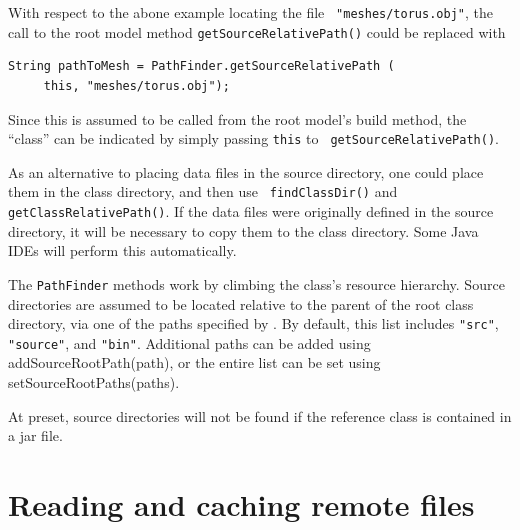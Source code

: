 With respect to the abone example locating the file {\tt
"meshes/torus.obj"}, the call to the root model method 
{\tt getSourceRelativePath()} could be replaced with
%
\begin{lstlisting}[]
  String pathToMesh = PathFinder.getSourceRelativePath (
     this, "meshes/torus.obj");
\end{lstlisting}
Since this is assumed to be called from the root model's build method,
the ``class'' can be indicated by simply passing {\tt this} to {\tt
getSourceRelativePath()}.

\begin{sideblock}
As an alternative to placing data files in the source directory, one
could place them in the class directory, and then use {\tt
findClassDir()} and {\tt getClassRelativePath()}. If the data files
were originally defined in the source directory, it will be necessary
to copy them to the class directory. Some Java IDEs will perform this
automatically.
\end{sideblock}

The {\tt PathFinder} methods work by climbing the class's resource
hierarchy.  Source directories are assumed to be located relative to
the parent of the root class directory, via one of the paths specified
by . By default, this
list includes {\tt "src"}, {\tt "source"}, and {\tt "bin"}. Additional
paths can be added using
%
{addSourceRootPath(path)},
or the entire list can be set using
%
{setSourceRootPaths(paths)}.

At preset, source directories will not be found if the reference class
is contained in a jar file.

\section{Reading and caching remote files}
\label{FileManager:sec}

